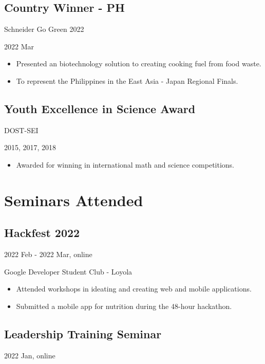 \begin{multicols}{2}
\subsection{Country Winner - PH}\hfill Schneider Go Green 2022

\hfill 2022 Mar

\begin{itemize}[noitemsep, topsep=0.25em]
\item Presented an biotechnology solution to creating cooking fuel from food waste.

\item To represent the Philippines in the East Asia - Japan Regional Finals.
\end{itemize}

\subsection{Youth Excellence in Science Award} \hfill DOST-SEI

\hfill 2015, 2017, 2018

\begin{itemize}[noitemsep, topsep=0.25em]
\item Awarded for winning in international math and science competitions.
\end{itemize}

\columnbreak

\section{Seminars Attended}

\subsection{Hackfest 2022} \hfill 2022 Feb - 2022 Mar, online

\hfill Google Developer Student Club - Loyola

\begin{itemize}[noitemsep, topsep=0.25em]
\item Attended workshops in ideating and creating web and mobile applications.

\item Submitted a mobile app for nutrition during the 48-hour hackathon.
\end{itemize}

\subsection{Leadership Training Seminar}\hfill 2022 Jan, online


\end{multicols}
